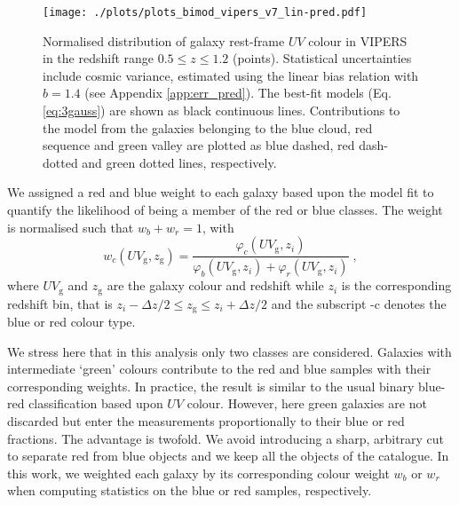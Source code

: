 \documentclass[longauth]{aa}
\def\({\left(}
\def\){\right)}
\begin{document}
	\begin{figure}
    \centering
		\texttt{[image: ./plots/plots\_bimod\_vipers\_v7\_lin-pred.pdf]}
		\caption{Normalised distribution of galaxy rest-frame $UV$ colour in VIPERS in the redshift range $0.5\le z\le 1.2$ (points). Statistical uncertainties include cosmic variance, estimated using the linear bias relation with $b=1.4$ (see Appendix \ref{app:err_pred}). The best-fit models (Eq. \ref{eq:3gauss}) are shown as black continuous lines. Contributions to the model from the galaxies belonging to the blue cloud, red sequence and green valley are plotted as blue dashed, red dash-dotted and green dotted lines, respectively.}\label{fig:bimod}
	\end{figure}
We assigned a red and blue weight to each galaxy based upon the model fit to quantify the likelihood of being a member of the red or blue classes.  The weight is normalised such that $w_b + w_r = 1$, with
\begin{equation}
		w_{c}\(UV_\mathrm{g},z_{\mathrm{g}}\) = \frac{\varphi_{c}\(UV_\mathrm{g},z_i\)}{\varphi_{b}\(UV_\mathrm{g},z_i\)+\varphi_{r}\(UV_\mathrm{g},z_i\)}\; ,			\label{eq:col_weights}
	\end{equation}
where $UV_\mathrm{g}$ and $z_{\mathrm{g}}$ are the galaxy colour and redshift while $z_i$ is the corresponding redshift bin, that is $z_i-\Delta z/2\le z_{\mathrm{g}}\le z_i+\Delta z/2$ and the subscript -c denotes the blue or red colour type.

We stress here that in this analysis only two classes are considered.  Galaxies with intermediate `green' colours contribute to the red and blue samples with their corresponding weights. In practice, the result is similar to the usual binary blue-red classification based upon $UV$ colour. However, here green galaxies are not discarded but enter the measurements proportionally to their blue or red fractions. The advantage is twofold. We avoid introducing a sharp, arbitrary cut to separate red from blue objects and we keep all the objects of the catalogue. In this work, we weighted each galaxy by its corresponding colour weight $w_b$ or $w_r$ when computing statistics on the blue or red samples, respectively.
\end{document}
